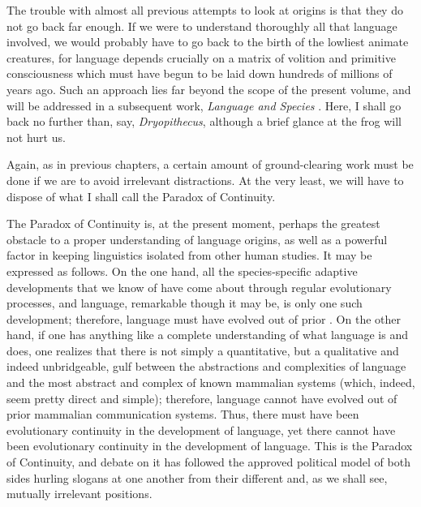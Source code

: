 The trouble with almost all previous attempts to look at origins is that they do not go back far enough. If we were to understand thoroughly all that language involved, we would probably have to go back to the birth of the lowliest animate creatures, for language depends crucially on a matrix of volition and primitive consciousness which must have begun to be laid down hundreds of millions of years ago. Such an approach lies far beyond the scope of the present volume, and will be addressed in a subsequent work, \textit{Language and Species} \citep{Bickerton1990}. Here, I shall go back no further than, say, \textit{Dryopithecus}, although a brief glance at the frog will not hurt us.

Again, as in previous chapters, a certain amount of ground-clearing work must be done if we are to avoid irrelevant distractions. At the very least, we will have to dispose of what I shall call the Paradox of Continuity.

The Paradox of Continuity is, at the present moment, perhaps the greatest obstacle to a proper understanding of language origins, as well as a powerful factor in keeping linguistics isolated from other human studies. It may be expressed as follows. On the one hand, all the species-specific adaptive developments that we know of have come about through regular evolutionary processes, and language, remarkable though it may be, is only one such development; therefore, language must have evolved out of prior . On the other hand, if one has anything like a complete understanding of what language is and does, one realizes that there is not simply a quantitative, but a qualitative and indeed unbridgeable, gulf between
the abstractions and complexities of language and the most abstract and complex of known mammalian systems (which, indeed, seem pretty direct and simple); therefore, language cannot have evolved out of prior mammalian communication systems. Thus, there must have been evolutionary continuity in the development of language, yet there cannot have been evolutionary continuity in the development of language. This is the Paradox of Continuity, and debate on it has followed the approved political model of both sides hurling slogans at one another from their different and, as we shall see, mutually irrele\-vant positions.\\\\

